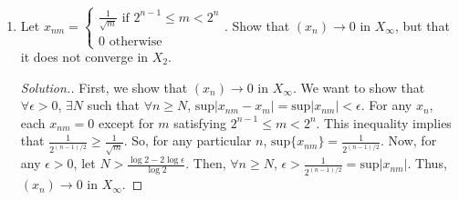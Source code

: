 \documentclass{article}
\newcommand{\N}{\mathbb{N}}
\newcommand{\C}{\mathbb{C}}
\newcommand{\sk}{\smallskip}
\begin{document}
\begin{enumerate}
\begin{enumerate}
\begin{proof}[Solution.]
            
            First, we show that $(x_n) \longrightarrow 0$ in $X_p$. In the product topology on $\C^\N$, $(x_n) \longrightarrow x$ if and only if $(\pi_m(x_n)) \longrightarrow \pi_m(x)$ for all $m$. Fix some $\epsilon > 0$ and some $m \in \N$ and let $N = m + 1$. Then $\forall n \geq N$, $x_{nm} = 0$, so $|x_{nm} - 0| < \epsilon$. Thus, $(\pi_m(x_n)) \longrightarrow 0$, and so $(x_n) \longrightarrow 0$.

            \sk

            Now we show that $(x_n)$ does not converge in $X_\infty$. Convergence in $X_\infty$ means that $\lim \text{sup}|x_{nm} - x_{m}| = 0$. Suppose $(x_n) \longrightarrow x$ for some $x = (x_1, x_2, x_3, \dots)$. For any $m$, we can pick an $n' > m$ and find an $x_{n'm'} = 1$. For such an $m'$, $x_m'$ must equal 1 in order to have that $\lim \text{sup} |x_{nm} - x_m| = 0$. As well, since $x_{n'm'+1} = 0$, $x_{m'+1}$ must equal 0. However, $x_{n'+1m'+1} = 1$, and so in order to maintain $\lim \text{sup}|x_{nm} - x_m| = 0$, we must have that $x_{m'+1} = 1$. This contradicts our earlier claim that $x_{m'+1} = 0$. Since this logic applies to any $x$, $(x_n)$ cannot converge in $X_\infty$.  

            \end{proof}

            \item Let $x_{nm} = \begin{cases}
                \frac{1}{\sqrt{m}} \text{ if } 2^{n-1} \leq m < 2^n \\
                0 \text{ otherwise }
            \end{cases}$. Show that $(x_n) \longrightarrow 0$ in $X_\infty$, but that it does not converge in $X_2$.

            \begin{proof}[Solution.]

            
            First, we show that $(x_n) \longrightarrow 0$ in $X_\infty$. We want to show that $\forall \epsilon > 0$, $\exists N$ such that $\forall n \geq N$, $\text{sup}|x_{nm} - x_{m}| = \text{sup}|x_{nm}|< \epsilon$. For any $x_n$, each $x_{nm} = 0$ except for $m$ satisfying $2^{n-1} \leq m < 2^n$. This inequality implies that $\frac{1}{2^{(n-1)/2}} \geq \frac{1}{\sqrt{m}}$. So, for any particular $n$, $\text{sup}\{x_{nm}\} = \frac{1}{2^{(n-1)/2}}$. Now, for any $\epsilon > 0$, let $N > \frac{\log 2 - 2 \log \epsilon}{\log 2}$. Then, $\forall n \geq N$, $\epsilon > \frac{1}{2^{(n-1)/2}} = \text{sup}|x_{nm}|$. Thus, $(x_n) \longrightarrow 0$ in $X_\infty$.


\end{proof}
\end{enumerate}
\end{enumerate}
\end{document}

